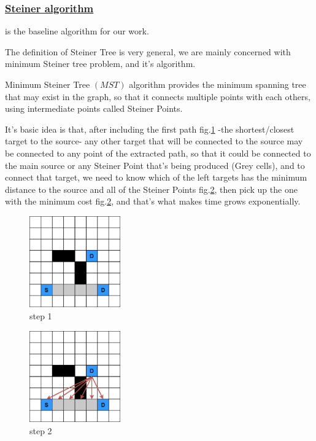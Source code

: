     \subsubsection{\underline{Steiner algorithm}}
    \label{SteinerSection}
    is the baseline algorithm for our work.

    The definition of Steiner Tree is very general, we are mainly concerned with minimum Steiner tree problem,
    and it's algorithm.

    Minimum Steiner Tree $(MST)$ algorithm provides the minimum spanning tree that may exist in the graph,
    so that it connects multiple points with each others, using intermediate points called Steiner Points.

    It's basic idea is that, after including the first path fig.\ref{fig:steiner_1} -the shortest/closest target to the source-
    any other target that will be connected to the source may be connected to any point of the 
    extracted path, so that it could be connected to the main source or any Steiner Point that's being produced (Grey cells),
    and to connect that target, we need to know which of the left targets has the minimum distance to the source
    and all of the Steiner Points fig.\ref{fig:steiner_2}, then pick up the one with the minimum cost fig.\ref{fig:steiner_2},
    and that's what makes time grows exponentially.

    \begin{figure}[H]
        \centering
        \includegraphics[width=0.35\textwidth]{figures/Steiner Stages/steiner_1.png}
        \caption{step 1}
        \label{fig:steiner_1}
    \end{figure}

    \begin{figure}[H]
        \centering
        \includegraphics[width=0.35\textwidth]{figures/Steiner Stages/steiner_2.png}
        \caption{step 2}
        \label{fig:steiner_2}
    \end{figure}

